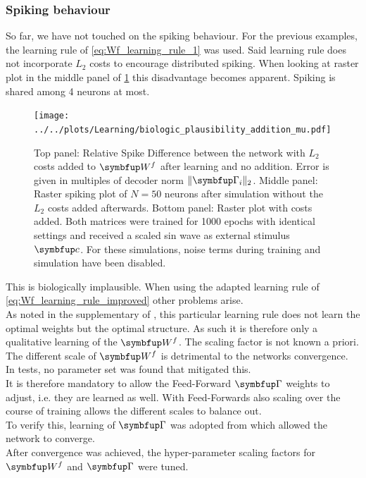 \subsubsection{Spiking behaviour}
So far, we have not touched on the spiking behaviour. For the previous examples, the learning rule of \cref{eq:Wf_learning_rule_1} was used. Said learning rule does not incorporate $L_2$ costs to encourage distributed spiking.
When looking at raster plot in the middle panel of \cref{fig:Wf_learned_spikes} this disadvantage becomes apparent. Spiking is shared among 4 neurons at most.
\begin{figure}
	\centering
	\texttt{[image: ../../plots/Learning/biologic\_plausibility\_addition\_mu.pdf]}
	\caption{Top panel: Relative Spike Difference between the network with $L_2$ costs added to $\bmu{W}^f$ after learning and no addition. Error is given in multiples of decoder norm $\|\bmu{\Gamma}_i\|_2$. Middle panel: Raster spiking plot of $N=50$ neurons after simulation without the $L_2$ costs added afterwards. Bottom panel: Raster plot with costs added. Both matrices were trained for 1000 epochs with identical settings and received a scaled sin wave as external stimulus $\bmu{c}$. For these simulations, noise terms during training and simulation have been disabled.}
	\label{fig:Wf_learned_spikes}
\end{figure}
This is biologically implausible. When using the adapted learning rule of \cref{eq:Wf_learning_rule_improved} other problems arise.\\
As noted in the supplementary of \cite{brendel_learning_2020}, this particular learning rule does not learn the optimal weights but the optimal structure. As such it is therefore only a qualitative learning of the $\bmu{W}^f$. The scaling factor is not known a priori. The different scale of $\bmu{W}^f$ is detrimental to the networks convergence. In tests, no parameter set was found that mitigated this.\\
It is therefore mandatory to allow the Feed-Forward $\bmu{\Gamma}$ weights to adjust, i.e. they are learned as well. With Feed-Forwards also scaling over the course of training allows the different scales to balance out.\\
To verify this, learning of $\bmu{\Gamma}$ was adopted from \cite{brendel_learning_2020} which allowed the network to converge.\\
After convergence was achieved, the hyper-parameter scaling factors for $\bmu{W}^f$ and $\bmu{\Gamma}$ were tuned.\\
